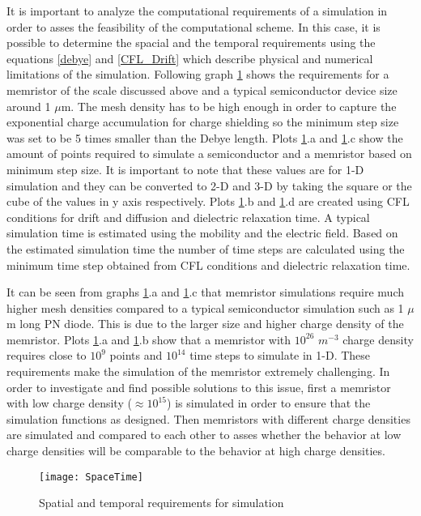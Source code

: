 \begin{doublespace}
It is important to analyze the computational requirements of a simulation in order to asses the feasibility of the computational scheme. In this case, it is possible to determine the spacial and the temporal requirements using the equations \ref{debye} and \ref{CFL_Drift} which describe physical and numerical limitations of the simulation. Following graph \ref{SpaceTime} shows the requirements for a memristor of the scale discussed above and a typical semiconductor device size around 1 $\mu$m. The mesh density has to be high enough in order to capture the exponential charge accumulation for charge shielding so the minimum step size was set to be 5 times smaller than the Debye length. Plots \ref{SpaceTime}.a and \ref{SpaceTime}.c show the amount of points required to simulate a semiconductor and a memristor based on minimum step size. It is important to note that these values are for 1-D simulation and they can be converted to 2-D and 3-D by taking the square or the cube of the values in y axis respectively. Plots \ref{SpaceTime}.b and \ref{SpaceTime}.d are created using CFL conditions for drift and diffusion and dielectric relaxation time. A typical simulation time is estimated using the mobility and the electric field. Based on the estimated simulation time the number of time steps are calculated using the minimum time step obtained from CFL conditions and dielectric relaxation time.

It can be seen from graphs \ref{SpaceTime}.a and \ref{SpaceTime}.c that memristor simulations require much higher mesh densities compared to a typical semiconductor simulation such as 1 $\mu$m long PN diode. This is due to the larger size and higher charge density of the memristor. Plots \ref{SpaceTime}.a and \ref{SpaceTime}.b show that a memristor with $10^{26}$ $m^{-3}$ charge density requires close to $10^9$ points and $10^{14}$ time steps to simulate in 1-D. These requirements make the simulation of the memristor extremely challenging. In order to investigate and find possible solutions to this issue, first a memristor with low charge density ($\approx 10^{15}$) is simulated in order to ensure that the simulation functions as designed. Then memristors with different charge densities are simulated and compared to each other to asses whether the behavior at low charge densities will be comparable to the behavior at high charge densities.

\begin{landscape}
\begin{figure}[htp]
\centering
\texttt{[image: SpaceTime]}
\caption{Spatial and temporal requirements for simulation} 
\label{SpaceTime}
\end{figure}
\end{landscape}



\end{doublespace}
